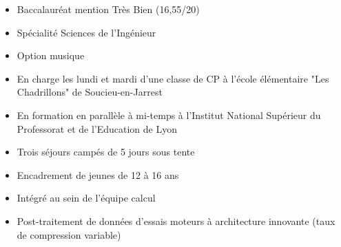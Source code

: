 \documentclass[10pt,a4paper,ragged2e,withhyper,normalphoto]{altacv}
\begin{document}
\begin{paracol}{2}
	\divider
	
	\begin{itemize}
		\item Baccalauréat mention Très Bien (16,55/20)
		\item Spécialité Sciences de l'Ingénieur
		\item Option musique
	\end{itemize}
	
		
	\medskip
	
	
	
	
	\begin{itemize}
		\item En charge les lundi et mardi d'une classe de CP à l'école élémentaire "Les Chadrillons" de Soucieu-en-Jarrest
		\item En formation en parallèle à mi-temps à l'Institut National Supérieur du Professorat et de l'Education de Lyon
	\end{itemize}
	
	\divider
	
	\begin{itemize}
		\item Trois séjours campés de 5 jours sous tente
		\item Encadrement de jeunes de 12 à 16 ans
	\end{itemize}
	
	\divider
	
	\begin{itemize}
		\item Intégré au sein de l'équipe calcul
		\item Post-traitement de données d'essais moteurs à architecture innovante (taux de compression variable)
	\end{itemize}
	

\end{paracol}
\end{document}
